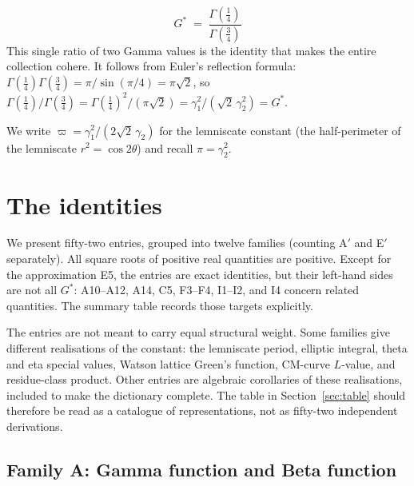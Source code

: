 \documentclass[12pt,reqno]{amsart}
\theoremstyle{definition}
\theoremstyle{remark}
\newcommand{\Gstar}{G^{\!*}}
\newcommand{\varpiup}{\varpi}
\begin{document}
\begin{tcolorbox}[colback=blue!3!white,colframe=blue!50!black,
  title={The simplest form}]
\begin{equation}\label{eq:simplest}
  \boxed{\;\Gstar \;=\; \frac{\Gamma(\tfrac14)}{\Gamma(\tfrac34)}\;}
\end{equation}
This single ratio of two Gamma values is the identity that makes the
entire collection cohere.  It follows from Euler's reflection formula:
$\Gamma(\tfrac14)\Gamma(\tfrac34) = \pi/\!\sin(\pi/4) = \pi\sqrt{2}$,
so $\Gamma(\tfrac14)/\Gamma(\tfrac34)
= \Gamma(\tfrac14)^{2}/(\pi\sqrt{2})
= \gamma_{1}^{2}/(\sqrt{2}\,\gamma_{2}^{2}) = \Gstar$.
\end{tcolorbox}

\medskip

We write $\varpiup = \gamma_{1}^{2}/(2\sqrt{2}\,\gamma_{2})$
for the lemniscate constant (the half-perimeter of the lemniscate
$r^{2}=\cos 2\theta$) and recall $\pi = \gamma_{2}^{2}$.


\section{The identities}\label{sec:identities}

We present fifty-two entries, grouped into twelve families (counting
A$'$ and E$'$ separately). All square roots of positive real quantities
are positive. Except for the approximation E5, the entries are exact
identities, but their left-hand sides are not all $\Gstar$: A10--A12,
A14, C5, F3--F4, I1--I2, and I4 concern related quantities. The summary
table records those targets explicitly.

The entries are not meant to carry equal structural weight.  Some families
give different realisations of the constant: the lemniscate period, elliptic
integral, theta and eta special values, Watson lattice Green's function,
CM-curve $L$-value, and residue-class product.  Other entries are algebraic
corollaries of these realisations, included to make the dictionary complete.
The table in Section~\ref{sec:table} should therefore be read as a catalogue
of representations, not as fifty-two independent derivations.

\subsection{Family A: Gamma function and Beta function}\label{sec:A}
\end{document}
